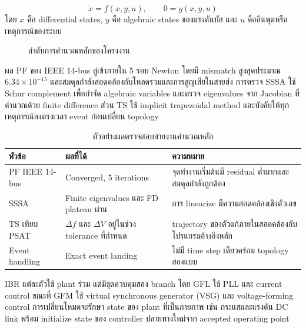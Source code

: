 \documentclass[12pt,a4paper]{article}
\newcommand{\templatesubheading}[1]{\vspace{0.35em}\noindent{\fontsize{16}{20}\selectfont\bfseries #1}\par\vspace{0.15em}}
\begin{document}
\begin{equation}
\dot{x}=f(x,y,u),\qquad 0=g(x,y,u)
\end{equation}
โดย $x$ คือ differential states, $y$ คือ algebraic states ของแรงดันบัส และ $u$ คืออินพุตหรือเหตุการณ์ของระบบ
\begin{figure}[H]
\centering
{}
\caption{ลำดับการคำนวณหลักของโครงงาน}
\end{figure}

ผล PF ของ IEEE 14-bus ลู่เข้าภายใน 5 รอบ Newton โดยมี mismatch สูงสุดประมาณ $6.34\times10^{-15}$ และสมดุลกำลังสอดคล้องกับโหลดรวมและการสูญเสียในสายส่ง การตรวจ SSSA ใช้ Schur complement เพื่อกำจัด algebraic variables และตรวจ eigenvalues จาก Jacobian ที่คำนวณด้วย finite difference ส่วน TS ใช้ implicit trapezoidal method และบังคับให้ทุกเหตุการณ์ลงตรงเวลา event ก่อนเปลี่ยน topology

\begin{table}[H]
\centering
\caption{ตัวอย่างผลตรวจสอบสายงานคำนวณหลัก}
\begin{tabularx}{0.94\textwidth}{@{}l l X@{}}
\toprule
หัวข้อ & ผลที่ได้ & ความหมาย \\
\midrule
PF IEEE 14-bus & Converged, 5 iterations & จุดทำงานเริ่มต้นมี residual ต่ำมากและสมดุลกำลังถูกต้อง \\
SSSA & Finite eigenvalues และ FD plateau ผ่าน & การ linearize มีความสอดคล้องเชิงตัวเลข \\
TS เทียบ PSAT & $\Delta f$ และ $\Delta V$ อยู่ในช่วง tolerance ที่กำหนด & trajectory ของตัวแก้ภายในสอดคล้องกับโปรแกรมอ้างอิงหลัก \\
Event handling & Exact event landing & ไม่มี time step เดียวคร่อม topology สองแบบ \\
\bottomrule
\end{tabularx}
\end{table}
\templatesubheading{2. พัฒนา IBR แบบสองโหมด GFL/GFM}
IBR แต่ละตัวใช้ plant ร่วม แต่มีชุดควบคุมสอง branch โดย GFL ใช้ PLL และ current control ขณะที่ GFM ใช้ virtual synchronous generator (VSG) และ voltage-forming control การเปลี่ยนโหมดจะรักษา state ของ plant ที่เป็นกายภาพ เช่น กระแสและแรงดัน DC link พร้อม initialize state ของ controller ปลายทางใหม่จาก accepted operating point
\end{document}
